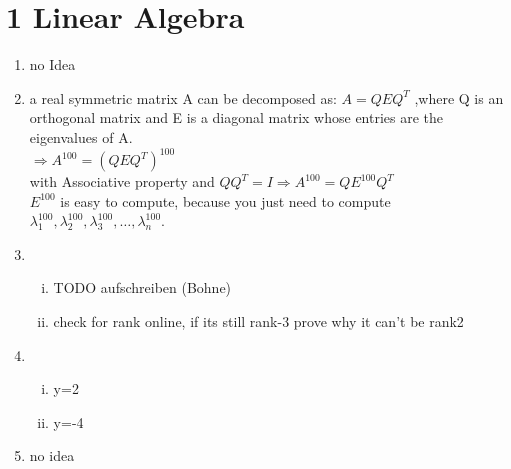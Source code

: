 \documentclass[12pt]{article}
\begin{document}

\section*{1 Linear Algebra}
\begin{enumerate}[1)]
    \item 
        no Idea
        
    \item
        a real symmetric matrix A can be decomposed as: $A=QEQ^T$ ,where Q is an orthogonal matrix and E is a diagonal matrix whose entries are the eigenvalues of A.\\
    $\Rightarrow A^{100}=(QEQ^T)^{100}$\\
    with Associative property and $QQ^T = I \Rightarrow A^{100}=QE^{100}Q^{T}$\\
    $E^{100}$ is easy to compute, because you just need to compute $\lambda_1^{100},\lambda_2^{100},\lambda_3^{100},\ldots,\lambda_n^{100}$.\\

    \item
        \begin{enumerate}[(i)]
            \item 
                TODO aufschreiben (Bohne)
            \item
                check for rank online, if its still rank-3 prove why it can't be rank2
        \end{enumerate}

    \item
        \begin{enumerate}[(i)]
            \item 
                y=2
            \item
                y=-4
        \end{enumerate}
    \item
        no idea
\end{enumerate}

\newpage
\end{document}

